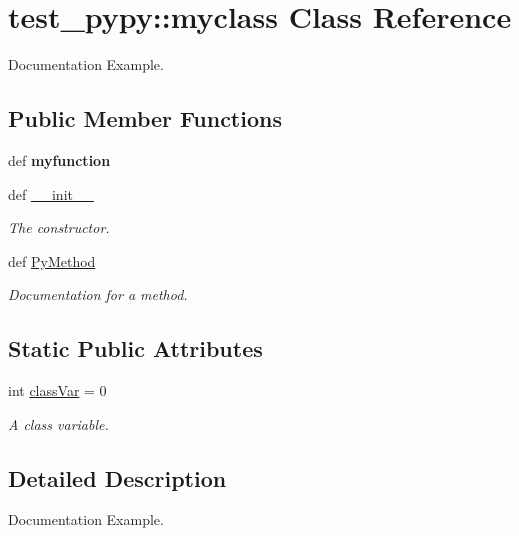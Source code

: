 \hypertarget{classtest__pypy_1_1myclass}{\section{test\-\_\-pypy\-:\-:myclass \-Class \-Reference}
\label{classtest__pypy_1_1myclass}
}


\-Documentation \-Example.  


\subsection*{\-Public \-Member \-Functions}
\begin{DoxyCompactItemize}
\item 
\hypertarget{classtest__pypy_1_1myclass_a9a2465f88977c823379c601a33ff3c5f}{def {\bfseries myfunction}}\label{classtest__pypy_1_1myclass_a9a2465f88977c823379c601a33ff3c5f}

\item 
def \hyperlink{classtest__pypy_1_1myclass_a31b26d9b26765ed3642a3163f703a263}{\-\_\-\-\_\-init\-\_\-\-\_\-}
\begin{DoxyCompactList}\small\item\em \-The constructor. \end{DoxyCompactList}\item 
def \hyperlink{classtest__pypy_1_1myclass_a780422861b5e7ee1cddef7c8704d7b77}{\-Py\-Method}
\begin{DoxyCompactList}\small\item\em \-Documentation for a method. \end{DoxyCompactList}\end{DoxyCompactItemize}
\subsection*{\-Static \-Public \-Attributes}
\begin{DoxyCompactItemize}
\item 
int \hyperlink{classtest__pypy_1_1myclass_aa4662a57d837c34d0c946e04ad477c71}{class\-Var} = 0
\begin{DoxyCompactList}\small\item\em \-A class variable. \end{DoxyCompactList}\end{DoxyCompactItemize}


\subsection{\-Detailed \-Description}
\-Documentation \-Example. 

